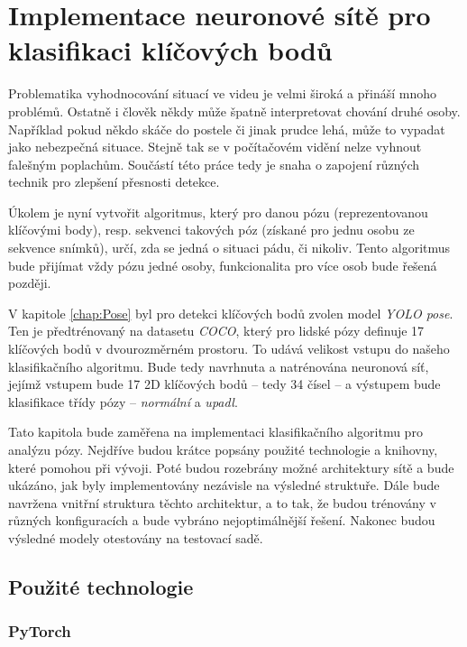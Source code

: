 \chapter{Implementace neuronové sítě pro klasifikaci klíčových bodů}
\label{chap:ClassificationImplementation}

Problematika vyhodnocování situací ve videu je velmi široká a přináší mnoho problémů. Ostatně i
člověk někdy může špatně interpretovat chování druhé osoby. Například pokud
někdo skáče do postele či jinak prudce lehá, může to vypadat jako nebezpečná
situace. Stejně tak se v počítačovém vidění nelze vyhnout falešným poplachům. Součástí této práce tedy je snaha o zapojení různých technik pro zlepšení přesnosti detekce.

Úkolem je nyní vytvořit algoritmus, který pro danou pózu (reprezentovanou
klíčovými body), resp. sekvenci takových póz (získané pro jednu osobu ze
sekvence snímků), určí, zda se jedná o situaci pádu, či nikoliv. Tento
algoritmus bude přijímat vždy pózu jedné osoby, funkcionalita pro více osob
bude řešená později.

V kapitole \ref{chap:Pose} byl pro detekci klíčových bodů zvolen model
\textit{YOLO pose}. Ten je předtrénovaný na datasetu \textit{COCO}, který pro
lidské pózy definuje 17 klíčových bodů v dvourozměrném prostoru. To udává
velikost vstupu do našeho klasifikačního algoritmu. Bude tedy navrhnuta a
natrénována neuronová síť, jejímž vstupem bude 17 2D klíčových bodů – tedy 34
čísel – a výstupem bude klasifikace třídy pózy – \textit{normální} a
\textit{upadl}.

Tato kapitola bude zaměřena na implementaci klasifikačního algoritmu pro
analýzu pózy. Nejdříve budou krátce popsány použité technologie a knihovny,
které pomohou při vývoji. Poté budou rozebrány možné architektury sítě a bude
ukázáno, jak byly implementovány nezávisle na výsledné struktuře. Dále bude
navržena vnitřní struktura těchto architektur, a to tak, že budou trénovány v
různých konfiguracích a bude vybráno nejoptimálnější řešení. Nakonec budou
výsledné modely otestovány na testovací sadě.

\section{Použité technologie}

\subsection{PyTorch}

